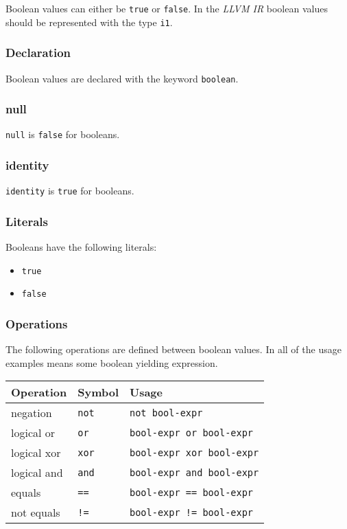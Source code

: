 \documentclass[../gazprea.tex]{subfiles}
\begin{document}
Boolean values can either be \texttt{true} or \texttt{false}. In the \textit{LLVM IR} boolean values
should be represented with the type \texttt{i1}.

\subsubsection{Declaration}
\label{sssec:boolean_decl}
Boolean values are declared with the keyword \texttt{boolean}.

\subsubsection{null}
\label{sssec:boolean_null}
\texttt{null} is \texttt{false} for booleans.

\subsubsection{identity}
\label{sssec:boolean_ident}
\texttt{identity} is \texttt{true} for booleans.

\subsubsection{Literals}
\label{sssec:boolean_lit}
Booleans have the following literals:
\begin{itemize}
	\item \texttt{true}
	\item \texttt{false}
\end{itemize}

\subsubsection{Operations}
The following operations are defined between boolean values. In all of the usage examples
 means some boolean yielding expression.

\begin{center}
\begin{tabular}{|l|l|l|}
	\hline
	\textbf{Operation} & \textbf{Symbol} & \textbf{Usage} \\
	\hline
	negation    & \texttt{not} & \texttt{not bool-expr}           \\
	logical or  & \texttt{or}  & \texttt{bool-expr or bool-expr}  \\
	logical xor & \texttt{xor} & \texttt{bool-expr xor bool-expr} \\
	logical and & \texttt{and} & \texttt{bool-expr and bool-expr} \\
	equals      & \texttt{==}	 & \texttt{bool-expr == bool-expr}  \\
	not equals  & \texttt{!=}	 & \texttt{bool-expr != bool-expr}  \\
	\hline
\end{tabular}
\end{center}
\end{document}
